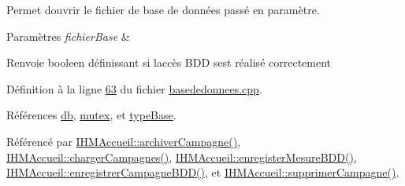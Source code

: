Permet d\textquotesingle{}ouvrir le fichier de base de données passé en paramètre. 


\begin{DoxyParams}{Paramètres}
{\em fichier\+Base} & \\
\hline
\end{DoxyParams}
\begin{DoxyReturn}{Renvoie}
booleen définissant si l\textquotesingle{}accès B\+DD s\textquotesingle{}est réalisé correctement 
\end{DoxyReturn}


Définition à la ligne \hyperlink{basededonnees_8cpp_source_l00063}{63} du fichier \hyperlink{basededonnees_8cpp_source}{basededonnees.\+cpp}.



Références \hyperlink{basededonnees_8h_source_l00030}{db}, \hyperlink{basededonnees_8h_source_l00031}{mutex}, et \hyperlink{basededonnees_8h_source_l00028}{type\+Base}.



Référencé par \hyperlink{ihmaccueil_8cpp_source_l00350}{I\+H\+M\+Accueil\+::archiver\+Campagne()}, \hyperlink{ihmaccueil_8cpp_source_l00130}{I\+H\+M\+Accueil\+::charger\+Campagnes()}, \hyperlink{ihmaccueil_8cpp_source_l00404}{I\+H\+M\+Accueil\+::enregister\+Mesure\+B\+D\+D()}, \hyperlink{ihmaccueil_8cpp_source_l00273}{I\+H\+M\+Accueil\+::enregistrer\+Campagne\+B\+D\+D()}, et \hyperlink{ihmaccueil_8cpp_source_l00375}{I\+H\+M\+Accueil\+::supprimer\+Campagne()}.


